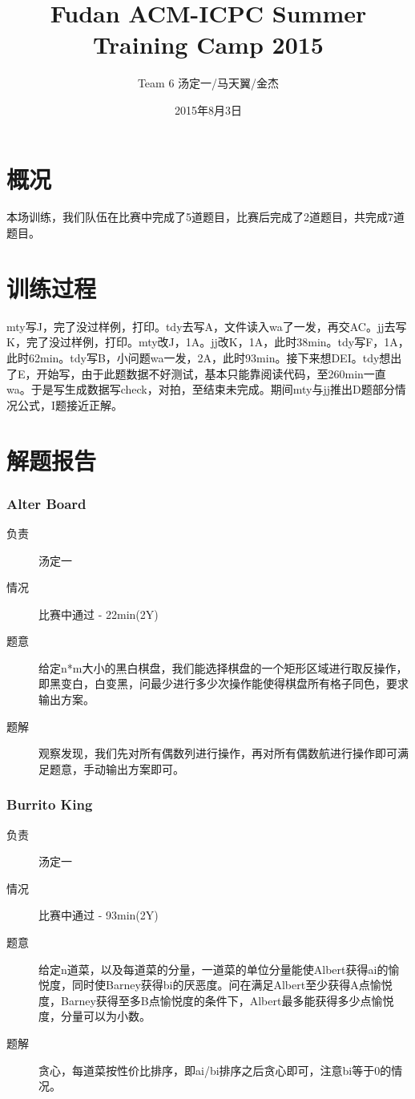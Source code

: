 \documentclass[a4paper, 11pt, nofonts, nocap, fancyhdr]{ctexart}
\title{Fudan ACM-ICPC Summer Training Camp 2015}
\author{Team 6 汤定一/马天翼/金杰}
\date{2015年8月3日}
\newcommand{\problem}[1]{\subsubsection{#1}}
\begin{document}
\maketitle

\section{概况}

本场训练，我们队伍在比赛中完成了5道题目，比赛后完成了2道题目，共完成7道题目。

\section{训练过程}

mty写J，完了没过样例，打印。tdy去写A，文件读入wa了一发，再交AC。jj去写K，完了没过样例，打印。mty改J，1A。jj改K，1A，此时38min。tdy写F，1A，此时62min。tdy写B，小问题wa一发，2A，此时93min。接下来想DEI。tdy想出了E，开始写，由于此题数据不好测试，基本只能靠阅读代码，至260min一直wa。于是写生成数据写check，对拍，至结束未完成。期间mty与jj推出D题部分情况公式，I题接近正解。

\section{解题报告}

\problem{Alter Board}

\begin{description}
\item[负责] 汤定一
\item[情况] 比赛中通过 - 22min(2Y)
\item[题意]
给定n*m大小的黑白棋盘，我们能选择棋盘的一个矩形区域进行取反操作，即黑变白，白变黑，问最少进行多少次操作能使得棋盘所有格子同色，要求输出方案。
\item[题解]
观察发现，我们先对所有偶数列进行操作，再对所有偶数航进行操作即可满足题意，手动输出方案即可。
\end{description}

\problem{Burrito King}

\begin{description}
\item[负责] 汤定一
\item[情况] 比赛中通过 - 93min(2Y)
\item[题意]
给定n道菜，以及每道菜的分量，一道菜的单位分量能使Albert获得ai的愉悦度，同时使Barney获得bi的厌恶度。问在满足Albert至少获得A点愉悦度，Barney获得至多B点愉悦度的条件下，Albert最多能获得多少点愉悦度，分量可以为小数。
\item[题解]
贪心，每道菜按性价比排序，即ai/bi排序之后贪心即可，注意bi等于0的情况。
\end{description}
\end{document}
